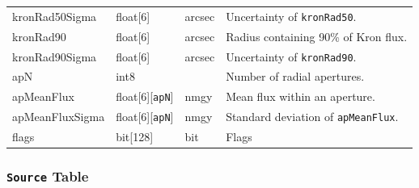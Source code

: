 \documentclass[12pt]{article}
\newcommand{\code}[1]{\texttt{#1}}
\newcommand{\Source}{\code{Source}\xspace}
\begin{document}
\begin{center}
\begin{longtable}{p{3cm}p{2cm}p{2cm}p{5cm}}
kronRad50Sigma & float[6] & arcsec & Uncertainty of {\tt kronRad50}. \\

kronRad90 & float[6] & arcsec & Radius containing 90\% of Kron flux. \\

kronRad90Sigma & float[6] & arcsec & Uncertainty of {\tt kronRad90}. \\


apN & int8 & ~ & Number of radial apertures. \\

apMeanFlux & float[6][{\tt apN}] & nmgy & Mean flux within an aperture. \\

apMeanFluxSigma & float[6][{\tt apN}] & nmgy & Standard deviation of {\tt apMeanFlux}. \\

flags & bit[128] & bit & Flags \\ \hline
\end{longtable}
\end{center}





\subsubsection{\Source Table}
\label{sec:sourceTable}
\end{document}
